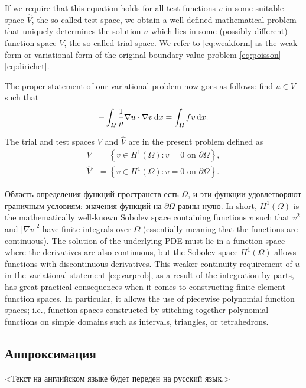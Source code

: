 If we require that this equation holds for all test functions $v$ in some suitable space $\hat V$, the so-called test space, we obtain a well-defined mathematical
problem that uniquely determines the solution $u$ which lies in some (possibly different) function space $V$, the so-called trial space. We refer to \eqref{eq:weakform} as
the weak form or variational form of the original boundary-value problem
\eqref{eq:poisson}--\eqref{eq:dirichet}.

The proper statement of our variational problem now goes as follows: find
$u \in V$ such that
\begin{equation} \label{eq:varprob}
- \int_\varOmega \frac 1 \rho \nabla u\cdot\nabla v \, \mathrm{d}x = \int_\varOmega f v \, \mathrm{d}x.
\end{equation}

The trial and test spaces $V$ and $\hat V$ are in the present problem defined as
\begin{align}
V &= \left\{v \in H^{1}(\Omega): v=0 \text { on } \partial \Omega\right\}, \\
\hat{V} &= \left\{v \in H^{1}(\Omega): v=0 \text { on } \partial \Omega\right\}.
\end{align}

Область определения функций пространств есть $\Omega$,
и эти функции удовлетворяют граничным условиям:
значения функций на $\partial\Omega$ равны нулю.
In short, $H^{1}(\Omega)$ is the mathematically well-known Sobolev space containing
functions $v$ such that $v^2$ and $|\nabla v|^2$ have finite integrals over $\Omega$
(essentially meaning that the functions are continuous). The solution of the underlying
PDE must lie in a function space where the derivatives are also continuous,
but the Sobolev space $H^{1}(\Omega)$ allows functions with discontinuous derivatives.
This weaker continuity requirement of $u$ in the variational statement \eqref{eq:varprob},
as a result of the integration by parts, has great practical consequences when it
comes to constructing finite element function spaces. In particular, it allows
the use of piecewise polynomial function spaces; i.e., function spaces constructed by stitching together polynomial functions on simple domains such
as intervals, triangles, or tetrahedrons.


\subsection{Аппроксимация}

<Текст на английском языке будет переден на русский язык.>

